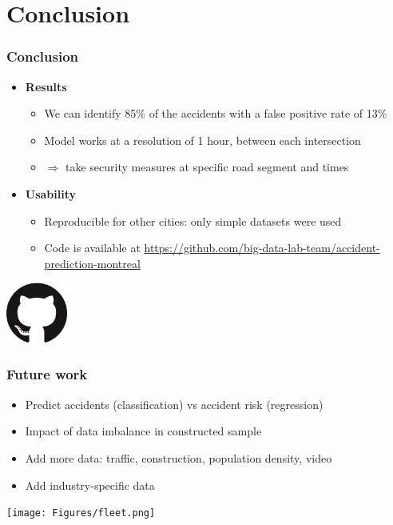 \documentclass[slidestop,compress,red,mathserif]{beamer}
\begin{document}
\section{Conclusion}

\begin{frame}
  \frametitle{Conclusion}
  \begin{itemize}
    \item[] \textbf{Results}
    \begin{itemize} 
    \item We can identify 85\% of the accidents with a false positive rate of 13\%
    \item Model works at a resolution of 1 hour, between each intersection
    \item $\Rightarrow$ take security measures at specific road segment and times
    \end{itemize}
    \item[] \textbf{Usability}
    \begin{itemize} 
    \item Reproducible for other cities: only simple datasets were used
    \item Code is available at \url{https://github.com/big-data-lab-team/accident-prediction-montreal}
    \end{itemize}
  \end{itemize}
  \centering
  \includegraphics[height=2cm]{Figures/github.png}
\end{frame}

\begin{frame}
  \frametitle{Future work}
  \begin{itemize}
    \item Predict accidents (classification) vs accident risk (regression)
    \item Impact of data imbalance in constructed sample
    \item Add more data: traffic, construction, population density, video
    \item Add industry-specific data
  \end{itemize}
  \centering
  \texttt{[image: Figures/fleet.png]}
\end{frame}
\end{document}

